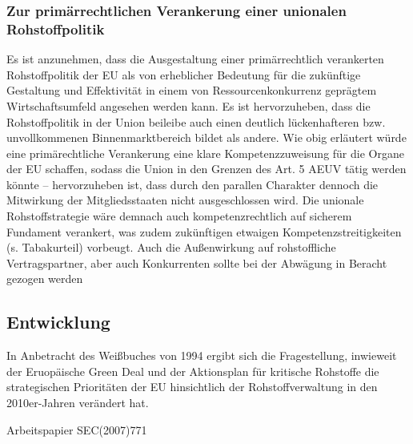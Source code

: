 \documentclass[12pt,a4paper,oneside]{book} %
\begin{document}
	\subsubsection{Zur primärrechtlichen Verankerung einer unionalen Rohstoffpolitik}
	Es ist anzunehmen, dass die Ausgestaltung einer primärrechtlich verankerten Rohstoffpolitik der EU als von erheblicher Bedeutung für die zukünftige Gestaltung und Effektivität in einem von Ressourcenkonkurrenz geprägtem Wirtschaftsumfeld angesehen werden kann. Es ist hervorzuheben, dass die Rohstoffpolitik in der Union beileibe auch einen deutlich lückenhafteren bzw. unvollkommenen Binnenmarktbereich bildet als andere.  Wie obig erläutert würde eine primärechtliche Verankerung eine klare Kompetenzzuweisung für die Organe der EU schaffen, sodass die Union in den Grenzen des Art. 5 AEUV tätig werden könnte -- hervorzuheben ist, dass durch den parallen Charakter dennoch die Mitwirkung der Mitgliedsstaaten nicht ausgeschlossen wird. Die unionale Rohstoffstrategie wäre demnach auch kompetenzrechtlich auf sicherem Fundament verankert, was zudem zukünftigen etwaigen Kompetenzstreitigkeiten (s. Tabakurteil) vorbeugt. Auch die Außenwirkung auf rohstoffliche Vertragspartner, aber auch Konkurrenten sollte bei der Abwägung in Beracht gezogen werden
	
		
	\subsection{Entwicklung}
	
	In Anbetracht des Weißbuches von 1994 ergibt sich die Fragestellung, inwieweit der Eruopäische Green Deal und der Aktionsplan für kritische Rohstoffe die strategischen Prioritäten der EU hinsichtlich der Rohstoffverwaltung in den 2010er-Jahren verändert hat.
	
	Arbeitspapier SEC(2007)771
	
\end{document}
